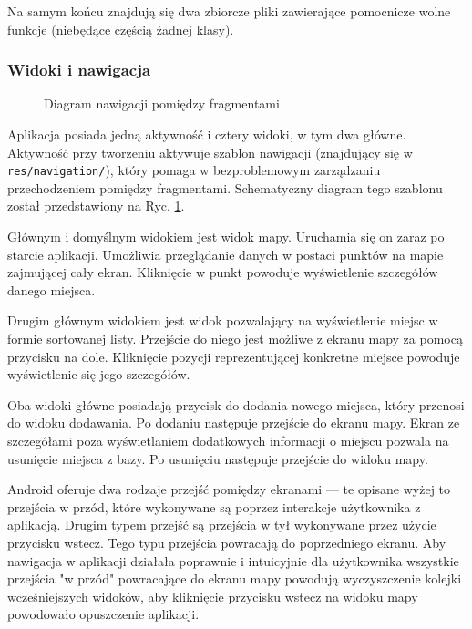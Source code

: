 \documentclass[polish,polish,a4paper,12pt]{article}
\begin{document}
		Na samym końcu znajdują się dwa zbiorcze pliki zawierające pomocnicze wolne funkcje (niebędące częścią żadnej klasy).


		\subsubsection{Widoki i nawigacja}

		\begin{figure}[H]
			\centering
			{\scriptsize
				
			}
			\caption{Diagram nawigacji pomiędzy fragmentami}
			\label{fig:navigation}
		\end{figure}

		Aplikacja posiada jedną aktywność i cztery widoki, w tym dwa główne. Aktywność przy tworzeniu aktywuje szablon nawigacji (znajdujący się w \texttt{res/navigation/}), który pomaga w bezproblemowym zarządzaniu przechodzeniem pomiędzy fragmentami. Schematyczny diagram tego szablonu został przedstawiony na Ryc. \ref{fig:navigation}.

		Głównym i domyślnym widokiem jest widok mapy. Uruchamia się on zaraz po starcie aplikacji. Umożliwia przeglądanie danych w postaci punktów na mapie zajmującej cały ekran. Kliknięcie w punkt powoduje wyświetlenie szczegółów danego miejsca.

		Drugim głównym widokiem jest widok pozwalający na wyświetlenie miejsc w formie sortowanej listy. Przejście do niego jest możliwe z ekranu mapy za pomocą przycisku na dole. Kliknięcie pozycji reprezentującej konkretne miejsce powoduje wyświetlenie się jego szczegółów.

		Oba widoki główne posiadają przycisk do dodania nowego miejsca, który przenosi do widoku dodawania. Po dodaniu następuje przejście do ekranu mapy. Ekran ze szczegółami poza wyświetlaniem dodatkowych informacji o miejscu pozwala na usunięcie miejsca z bazy. Po usunięciu następuje przejście do widoku mapy.

		Android oferuje dwa rodzaje przejść pomiędzy ekranami \cite{androiddevelopment} — te opisane wyżej to przejścia w przód, które wykonywane są poprzez interakcje użytkownika z aplikacją. Drugim typem przejść są przejścia w tył wykonywane przez użycie przycisku wstecz. Tego typu przejścia powracają do poprzedniego ekranu. Aby nawigacja w aplikacji działała poprawnie i intuicyjnie dla użytkownika wszystkie przejścia "w przód" powracające do ekranu mapy powodują wyczyszczenie kolejki wcześniejszych widoków, aby kliknięcie przycisku wstecz na widoku mapy powodowało opuszczenie aplikacji.
\end{document}
